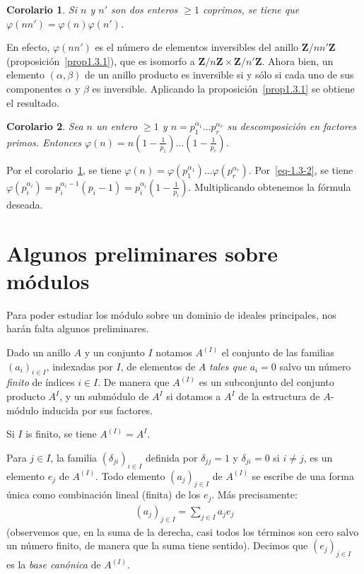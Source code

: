 \documentclass[bibtotoc,leqno,spanish]{amsbook}
\newcommand{\ZZ}{\mathbf{Z}}
\numberwithin{equation}{section}
\theoremstyle{note}
\theoremstyle{note}
\newtheorem{corollary}{Corolario}
\theoremstyle{rem}
\numberwithin{theorem}{section}
\numberwithin{proposition}{section}
\numberwithin{definition}{section}
\numberwithin{lemma}{section}
\numberwithin{corollary}{section}
\numberwithin{example}{section}
\numberwithin{footnote}{section}%
\begin{document}
\begin{corollary}\label{coro1.3.1}
Si $n$ y $n'$ son dos enteros $\geq 1$ coprimos, se tiene que
$\varphi(nn') = \varphi(n)\varphi(n')$.
\end{corollary}

En efecto, $\varphi(nn')$ es el n\'umero de elementos inversibles del anillo $\ZZ/nn'\ZZ$
(proposici\'on~\ref{prop1.3.1}), que es isomorfo a $\ZZ/n\ZZ\times\ZZ/n'\ZZ$. Ahora
bien, un elemento
$(\alpha,\beta)$ de un anillo producto es inversible si y s\'olo si cada uno de sus componentes
$\alpha$ y $\beta$ es inversible. Aplicando la proposici\'on~\ref{prop1.3.1} se
obtiene el resultado.

\begin{corollary}
Sea $n$ un entero $\geq 1$ y $n = p_{1}^{\alpha_{1}}\dots p_{r}^{\alpha_{r}}$ su
descomposici\'on
en factores primos. Entonces
$\varphi(n) = n\left(1-\frac{1}{p_{1}}\right)\dots\left(1-\frac{1}{p_{r}}\right)$.
\end{corollary}

Por el corolario~\ref{coro1.3.1}, se tiene
$\varphi(n) = \varphi(p_{1}^{\alpha_{1}})\dots\varphi(p_{r}^{\alpha_{r}})$.
Por~\eqref{eq-1.3-2}, se tiene $\varphi(p_{i}^{\alpha_{i}}) = p_{i}^{\alpha_{i}-1}(p_{i}-1)
=p_{i}^{\alpha_{i}}\left(1-\frac{1}{p_{i}}\right)$. Multiplicando obtenemos
la f\'ormula deseada.

\section{Algunos preliminares sobre m\'odulos}\label{sec1.4}

Para poder estudiar los m\'odulo sobre un dominio de ideales principales, nos har\'an
falta algunos preliminares.

Dado un anillo $A$ y un conjunto $I$ notamos $A^{(I)}$ el conjunto de las
familias $(a_{i})_{i\in I}$,
indexadas por $I$, de elementos de $A$ {\em tales que} $a_{i} = 0$ salvo un
n\'umero {\em finito} de \'indices
$i\in I$. De manera que $A^{(I)}$ es un subconjunto del conjunto producto $A^{I}$,
y un subm\'odulo de $A^{I}$ si
dotamos a $A^{I}$ de la estructura de $A$-m\'odulo inducida por sus factores.

Si $I$ is finito, se tiene $A^{(I)} = A^{I}$.

Para $j\in I$, la familia $(\delta_{ji})_{i\in I}$ definida por
$\delta_{jj} = 1$ y $\delta_{ji} = 0$ si
$i\neq j$, es un elemento $e_{j}$ de $A^{(I)}$. Todo elemento $(a_{j})_{j\in I}$
de $A^{(I)}$ se escribe
de una forma \'unica como combinaci\'on lineal (finita) de los $e_{j}$. M\'as precisamente:
\begin{gather}
(a_{j})_{j\in I} = \sum_{j\in I}a_{j}e_{j}
\end{gather}
(observemos que, en la suma de la derecha, casi todos los t\'erminos son cero salvo un
n\'umero finito, de manera
que la suma tiene sentido). Decimos que $(e_{j})_{j\in I}$ es la
{\em base can\'onica} de $A^{(I)}$.
\end{document}
